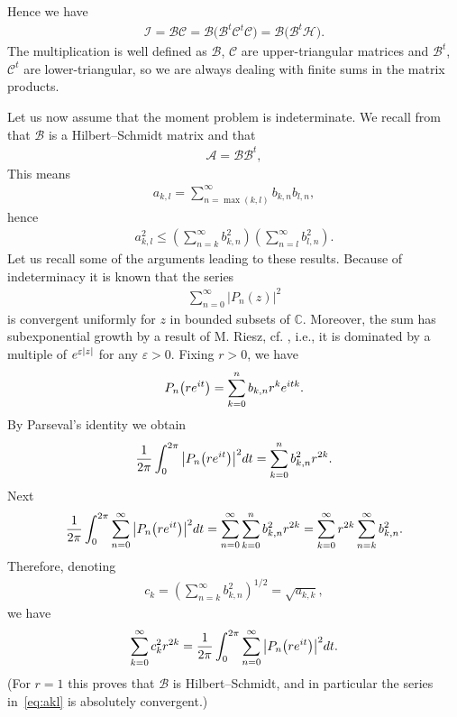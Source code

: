 \documentclass[11pt]{article}
\numberwithin{equation}{section}
\begin{document}
Hence we have
\begin{gather}\label{eq:I=B(B^tH)}
\mathcal I=\mathcal B\mathcal C=\mathcal B\big(\mathcal B^t\mathcal C^t\mathcal C\big)=\mathcal B\big(\mathcal B^t\mathcal{H}\big).
\end{gather}
The multiplication is well defined as $\mathcal B$, $\mathcal C$ are upper-triangular matrices and $\mathcal B^t$, $\mathcal C^t$ are lower-triangular, so we are always dealing with finite sums in the matrix products.

Let us now assume that the moment problem is indeterminate. We recall from \cite[Proposition~4.2]{B:S1} that $\mathcal B$ is a Hilbert--Schmidt matrix and that \begin{gather}\label{eq:A=BBt}
\mathcal{A}=\mathcal B\mathcal B^t,
\end{gather}
 This means
\begin{gather}\label{eq:akl}
a_{k,l}=\sum^\infty_{n=\max(k,l)}b_{k,n}b_{l,n},
\end{gather}
hence
\begin{gather*}
a_{k,l}^2\le \left (\sum_{n=k}^\infty b_{k,n}^2\right ) \left (\sum_{n=l}^\infty b_{l,n}^2\right ).\end{gather*}
Let us recall some of the arguments leading to these results. Because of indeterminacy it
is known that the series
\begin{gather*}
\sum_{n=0}^\infty |P_n(z)|^2
\end{gather*}
 is convergent uniformly for $z$ in bounded subsets of $\mathbb{C}$. Moreover, the sum has subexponential growth by a result of M. Riesz, cf. \cite[p. 56]{Ak}, i.e., it is dominated by a multiple of ${\rm e}^{\varepsilon |z|}$ for any $\varepsilon>0$.
Fixing $r>0$, we have
\begin{gather*}
P_n\big(r{\rm e}^{{\rm i}t}\big)=\sum_{k=0}^n b_{k,n}r^k{\rm e}^{{\rm i}tk}.
\end{gather*}
By Parseval's identity we obtain
\begin{gather*}
{1\over 2\pi}\int_0^{2\pi}\big|P_n\big(r{\rm e}^{{\rm i}t}\big)\big|^2{\rm d}t = \sum_{k=0}^n b_{k,n}^2r^{2k}.
\end{gather*}
 Next
\begin{gather*}
{1\over 2\pi}\int_0^{2\pi}\sum_{n=0}^\infty \big|P_n\big(r{\rm e}^{{\rm i}t}\big)\big|^2{\rm d}t=\sum_{n=0}^\infty\sum_{k=0}^n b_{k,n}^2r^{2k}=\sum_{k=0}^\infty r^{2k}\sum_{n=k}^\infty b_{k,n}^2.
\end{gather*}
Therefore, denoting
\begin{gather}\label{eq:c_k}
c_k=\left (\sum_{n=k}^\infty b_{k,n}^2\right )^{1/2}=\sqrt{a_{k,k}},
\end{gather}
 we have
\begin{gather*}\label{eq:r}
\sum_{k=0}^\infty c_k^2r^{2k}={1\over 2\pi}\int_0^{2\pi}\sum_{n=0}^\infty \big|P_n\big(r{\rm e}^{{\rm i}t}\big)\big|^2{\rm d}t.
\end{gather*}
(For $r=1$ this proves that $\mathcal B$ is Hilbert--Schmidt, and in particular the series in~\eqref{eq:akl} is absolutely convergent.)
\end{document}
